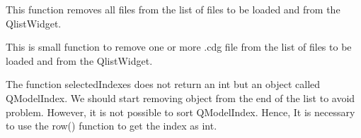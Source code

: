 \documentclass[letterpaper,10pt,english]{sphinxmanual}
\begin{document}
\begin{fulllineitems}
\begin{fulllineitems}
\end{fulllineitems}


\begin{fulllineitems}
\label{\detokenize{index:src_GUI.hydro_GUI_2.River2D.remove_all_file}}
This function removes all files from the list of files to be loaded and from the QlistWidget.

\end{fulllineitems}


\begin{fulllineitems}
\label{\detokenize{index:src_GUI.hydro_GUI_2.River2D.remove_file}}
This is small function to remove one or more .cdg file from the list of files to be loaded and from
the QlistWidget.


The function selectedIndexes does not return an int but an object called QModelIndex. We should start removing
object from the end of the list to avoid problem. However, it is not possible to sort QModelIndex. Hence,
It is necessary to use the row() function to get the index as int.

\end{fulllineitems}


\end{fulllineitems}

\end{document}
